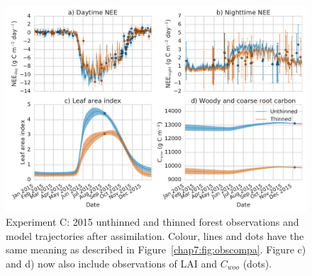 \begin{figure}[ht]
    \centering
        \includegraphics[width=\textwidth]{chapter/chapter7/obs_compc.pdf}
\caption{Experiment C: 2015 unthinned and thinned forest observations and model trajectories after assimilation. Colour, lines and dots have the same meaning as described in Figure~\ref{chap7:fig:obscompa}. Figure c) and d) now also include observations of LAI and \(C_{woo}\) (dots).}
 \label{chap7:fig:obscompc}
 \end{figure}

